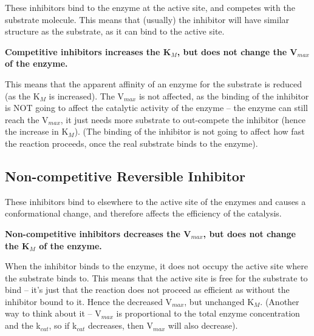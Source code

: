 \begin{center}
\end{center}

These inhibitors bind to the enzyme at the active site, and competes with the substrate molecule.
This means that (usually) the inhibitor will have similar structure as the substrate, as it can bind to the active site.

\begin{center}
\textbf{Competitive inhibitors increases the K$_M$, but does not change the V$_{max}$ of the enzyme.}
\end{center}

This means that the apparent affinity of an enzyme for the substrate is reduced (as the K$_M$ is increased).
The V$_{max}$ is not affected, as the binding of the inhibitor is NOT going to affect the catalytic activity of the enzyme -- the enzyme can still reach the V$_{max}$, it just needs more substrate to out-compete the inhibitor (hence the increase in K$_M$).
(The binding of the inhibitor is not going to affect how fast the reaction proceeds, once the real substrate binds to the enzyme).

\subsection{Non-competitive Reversible Inhibitor}

\begin{center}
\end{center}

These inhibitors bind to elsewhere to the active site of the enzymes and causes a conformational change, and therefore affects the efficiency of the catalysis.

\begin{center}
\textbf{Non-competitive inhibitors decreases the V$_{max}$, but does not change the K$_M$ of the enzyme.}
\end{center}

When the inhibitor binds to the enzyme, it does not occupy the active site where the substrate binds to.
This means that the active site is free for the substrate to bind -- it's just that the reaction does not proceed as efficient as without the inhibitor bound to it.
Hence the decreased V$_{max}$, but unchanged K$_M$.
(Another way to think about it -- V$_{max}$ is proportional to the total enzyme concentration and the k$_{cat}$, so if k$_{cat}$ decreases, then V$_{max}$ will also decrease).

